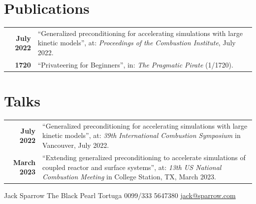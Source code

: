 \documentclass[lighthipster]{simplehipstercv}
\newlength{\rightcolwidth}
\begin{document}
\begin{paracol}{2}
\begin{minipage}[t]{0.35\textwidth}
\section*{Publications}
\begin{tabular}{>{\footnotesize\bfseries}r >{\footnotesize}p{}}
    July 2022 & ``Generalized preconditioning for accelerating simulations with large kinetic models'', at: \emph{Proceedings of the Combustion Institute}, July 2022. \\
    1720 & ``Privateering for Beginners'', in: \emph{The Pragmatic Pirate} (1/1720).
\end{tabular}
\end{minipage}\hfill
\begin{minipage}[t]{0.35\textwidth}
\section*{Talks}
\begin{tabular}{>{\footnotesize\bfseries}r >{\footnotesize}p{}}
    July 2022 & ``Generalized preconditioning for accelerating simulations with large kinetic models'', at: \emph{39th International Combustion Symposium} in Vancouver, July 2022.\\
    March 2023 & ``Extending generalized preconditioning to accelerate simulations of coupled reactor and surface systems'', at: \emph{13th US National Combustion Meeting} in College Station, TX, March 2023.\\
\end{tabular}
\end{minipage}






\vfill{} %

\setlength{\parindent}{0pt}
\begin{minipage}[t]{\rightcolwidth}
\begin{center}\fontfamily{\sfdefault}\selectfont \color{black!70}
{\small Jack Sparrow  The Black Pearl  Tortuga  0099/333 5647380 \newline{} \protect\url{jack@sparrow.com}
}
\end{center}
\end{minipage}

\end{paracol}
\end{document}
